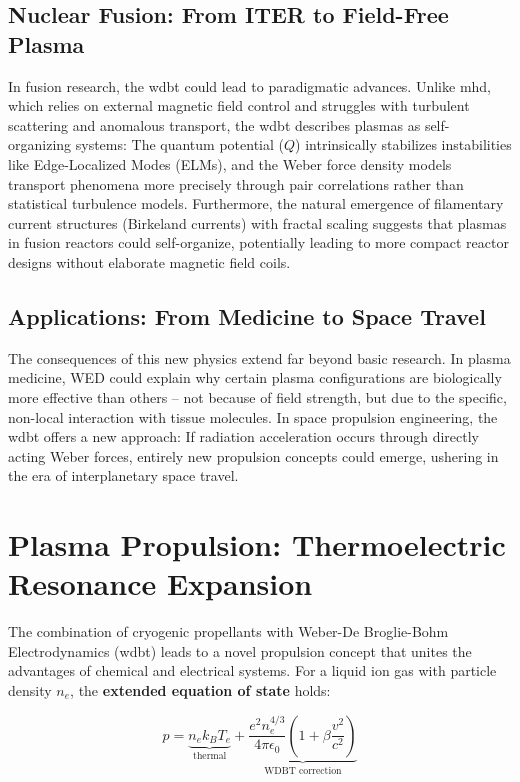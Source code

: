 \subsection{Nuclear Fusion: From ITER to Field-Free Plasma}
In fusion research, the \gls{wdbt} could lead to paradigmatic advances. Unlike \gls{mhd}, which relies on external magnetic field control and struggles with turbulent scattering and anomalous transport, the \gls{wdbt} describes plasmas as self-organizing systems: The quantum potential ($Q$) intrinsically stabilizes instabilities like Edge-Localized Modes (ELMs), and the Weber force density models transport phenomena more precisely through pair correlations rather than statistical turbulence models. Furthermore, the natural emergence of filamentary current structures (Birkeland currents) with fractal scaling suggests that plasmas in fusion reactors could self-organize, potentially leading to more compact reactor designs without elaborate magnetic field coils.

\subsection{Applications: From Medicine to Space Travel}
The consequences of this new physics extend far beyond basic research. In plasma medicine, WED could explain why certain plasma configurations are biologically more effective than others – not because of field strength, but due to the specific, non-local interaction with tissue molecules. In space propulsion engineering, the \gls{wdbt} offers a new approach: If radiation acceleration occurs through directly acting Weber forces, entirely new propulsion concepts could emerge, ushering in the era of interplanetary space travel.

\section{Plasma Propulsion: Thermoelectric Resonance Expansion}
\label{sec:hybrid_antrieb}

The combination of cryogenic propellants with Weber-De Broglie-Bohm Electrodynamics (\gls{wdbt}) leads to a novel propulsion concept that unites the advantages of chemical and electrical systems.
For a liquid ion gas with particle density $n_e$, the \textbf{extended equation of state} holds:

\begin{equation}
p = \underbrace{n_e k_B T_e}_{\text{thermal}} 
+ \underbrace{\frac{e^2 n_e^{4/3}}{4\pi \epsilon_0} \left(1 + \beta \frac{v^2}{c^2}\right)}_{\text{WDBT correction}}
\label{eq:druck}
\end{equation}

